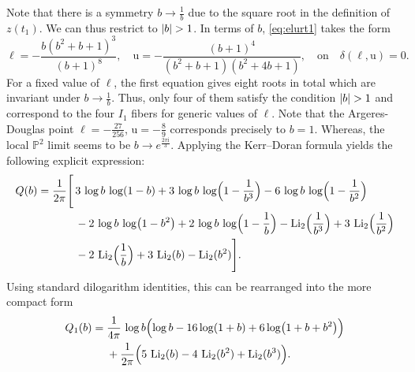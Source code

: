 \documentclass[11pt, a4paper]{article}
\newcommand{\ii}{\mathrm{i}}
\newcommand{\Li}{\operatorname{Li}}
\newcommand{\ur}{\mathrm{u}}
\numberwithin{equation}{section}
\begin{document}
Note that there is a symmetry $b \to \frac{1}{b}$ due to the square root in the definition of $z(t_1)$. We can thus restrict to $\abs{b} > 1$. In terms of $b$, \cref{eq:elurt1} takes the form
\begin{equation}\label{eq:elur-in-terms-of-b}
  \ell = -\frac{b \left(b^2+b+1\right)^3}{(b+1)^8}, \quad \ur = -\frac{(b+1)^4}{\left(b^2+b+1\right) \left(b^2+4 b+1\right)}, \quad \text{on} \quad \delta(\ell, \ur) = 0.
\end{equation}
For a fixed value of $\ell$, the first equation gives eight roots in total which are invariant under $b \to \tfrac{1}{b}$. Thus, only four of them satisfy the condition $\abs{b} > 1$ and correspond to the four $I_1$ fibers for generic values of $\ell$. Note that the Argeres-Douglas point $\ell = -\tfrac{27}{256}$, $\ur = -\tfrac89$ corresponds precisely to $b = 1$. Whereas, the local $\mathbb{P}^2$ limit seems to be $b \to e^{\tfrac{2\pi \ii}{3}}$.
%
Applying the Kerr--Doran formula yields the following explicit expression:
\begin{equation}\label{eqn:kerrdoranQ}
\begin{aligned}
Q(b)
=\frac{1}{2\pi}\Bigg[
&\,3\,\log b\,\log(1-b)
+3\,\log b\,\log\Bigl(1-\frac{1}{b^{3}}\Bigr)
-6\,\log b\,\log\Bigl(1-\frac{1}{b^{2}}\Bigr)\\
&\,-2\,\log b\,\log(1-b^{2})
+2\,\log b\,\log\Bigl(1-\frac{1}{b}\Bigr)
-\Li_{2}\Bigl(\frac{1}{b^{3}}\Bigr)
+3\,\Li_{2}\Bigl(\frac{1}{b^{2}}\Bigr)\\
&\,-2\,\Li_{2}\Bigl(\frac{1}{b}\Bigr)
+3\,\Li_{2}(b)
-\Li_{2}(b^{2})
\Bigg].
\end{aligned}
\end{equation}
%
Using standard dilogarithm identities, this can be rearranged into the more compact form
\begin{equation}\label{eqn:kerrdoranQ1}
\begin{aligned}
Q_{1}(b)
=\;&\frac{1}{4\pi}\,\log b\Bigl(\log b-16\log(1+b)+6\log(1+b+b^{2})\Bigr)\\
&+\frac{1}{2\pi}\Bigl(5\,\Li_{2}(b)-4\,\Li_{2}(b^{2})+\Li_{2}(b^{3})\Bigr).
\end{aligned}
\end{equation}
\end{document}
